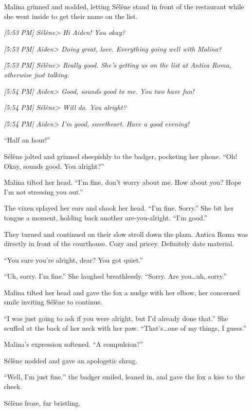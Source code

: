 Malina grinned and nodded, letting Sélène stand in front of the restaurant while she went inside to get their name on the list.

\emph{{[}5:53 PM{]} Sélène\textgreater{} Hi Aiden! You okay?}

\emph{{[}5:53 PM{]} Aiden\textgreater{} Doing great, love. Everything going well with Malina?}

\emph{{[}5:53 PM{]} Sélène\textgreater{} Really good. She's getting us on the list at Antica Roma, otherwise just talking.}

\emph{{[}5:54 PM{]} Aiden\textgreater{} Good, sounds good to me. You two have fun!}

\emph{{[}5:54 PM{]} Sélène\textgreater{} Will do. You alright?}

\emph{{[}5:54 PM{]} Aiden\textgreater{} I'm good, sweetheart. Have a good evening!}

``Half an hour!''

Sélène jolted and grinned sheepishly to the badger, pocketing her phone. ``Oh! Okay, sounds good. You alright?''

Malina tilted her head. ``I'm fine, don't worry about me. How about you? Hope I'm not stressing you out.''

The vixen splayed her ears and shook her head. ``I'm fine. Sorry.'' She bit her tongue a moment, holding back another are-you-alright. ``I'm good.''

They turned and continued on their slow stroll down the plaza. Antica Roma was directly in front of the courthouse. Cozy and pricey. Definitely date material.

``You sure you're alright, dear? You got quiet.''

``Uh, sorry. I'm fine.'' She laughed breathlessly. ``Sorry. Are you\ldots{}uh, sorry.''

Malina tilted her head and gave the fox a nudge with her elbow, her concerned smile inviting Sélène to continue.

``I was just going to ask if you were alright, but I'd already done that.'' She scuffed at the back of her neck with her paw. ``That's\ldots{}one of my things, I guess.''

Malina's expression softened. ``A compulsion?''

Sélène nodded and gave an apologetic shrug.

``Well, I'm just fine,'' the badger smiled, leaned in, and gave the fox a kiss to the cheek.

Sélène froze, fur bristling.

